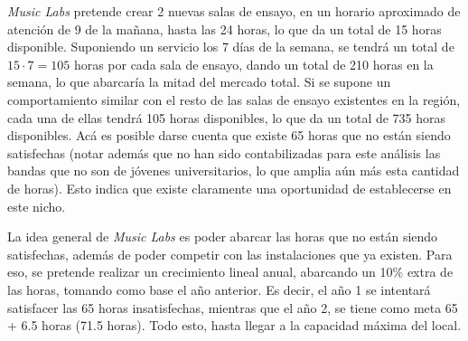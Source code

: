 \emph{Music Labs} pretende crear 2 nuevas salas de ensayo, en un horario 
aproximado de atención de 9 de la mañana, hasta las 24 horas, lo que da un 
total de 15 horas disponible. Suponiendo un servicio los 7 días de la semana, 
se tendrá un total de $15\cdot7 = 105$ horas por cada sala de ensayo, dando 
un total de 210 horas en la semana, lo que abarcaría la mitad del mercado total.
Si se supone un comportamiento similar con el resto de las salas de ensayo
existentes en la región, cada una de ellas tendrá 105 horas disponibles, lo 
que da un total de 735 horas disponibles. Acá es posible darse cuenta que 
existe 65 horas que no están siendo satisfechas (notar además que no han sido
contabilizadas para este análisis las bandas que no son de jóvenes
universitarios, lo que amplia aún más esta cantidad de horas). Esto indica
que existe claramente una oportunidad de establecerse en este nicho.

La idea general de \emph{Music Labs} es poder abarcar las horas que no están siendo 
satisfechas, además de poder competir con las instalaciones que ya existen.
Para eso, se pretende realizar un crecimiento lineal anual, abarcando un 10\% extra de las horas, 
tomando como base el año anterior. Es decir, el año 1 se intentará satisfacer las 65 horas 
insatisfechas, mientras que el año 2, se tiene como meta 65 + 6.5 horas (71.5 horas). Todo esto, hasta llegar 
a la capacidad máxima del local.

%
%
%
%
%
%
%
%
%
%
%
%
%
